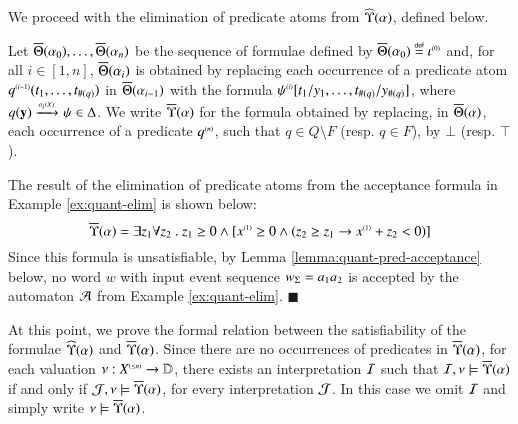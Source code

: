 \documentclass{llncs}
\begin{document}
We proceed with the elimination of predicate atoms from
$\widehat{\Upsilon}({\alpha})$, defined below. 

\begin{definition}\label{def:substform}
  Let $\overline{\Theta}({\alpha_0}), \ldots, \overline{\Theta}({\alpha_n})$ be the
  sequence of formulae defined by $\overline{\Theta}({\alpha_0}) \stackrel{\scriptscriptstyle{\mathsf{def}}}{=}
  {\iota}^{\scriptscriptstyle{({0})}}$ and, for all $i \in [1,n]$,
  $\overline{\Theta}({\alpha_i})$ is obtained by replacing each occurrence of
  a predicate atom ${q}^{\scriptscriptstyle{({i-1})}}(t_1,\ldots,t_{\#(q)})$ in
  $\overline{\Theta}({\alpha_{i-1}})$ with the formula
  ${\psi}^{\scriptscriptstyle{({i})}}[t_1/y_1,\ldots,t_{\#(q)}/y_{\#(q)}]$, where
  $q(\mathbf y) \xrightarrow{{\scriptscriptstyle a_{i}(X)}}_{{\scriptstyle }} \psi \in \Delta$. We write
  $\overline{\Upsilon}({\alpha})$ for the formula obtained by replacing, in
  $\overline{\Theta}({\alpha})$, each occurrence of a predicate
  ${q}^{\scriptscriptstyle{({n})}}$, such that $q \in Q \setminus F$ (resp. $q \in F$),
  by $\bot$ (resp. $\top$).
\end{definition}

\begin{example}\label{ex:pred-elim}
  The result of the elimination of predicate atoms from the acceptance
  formula in Example \ref{ex:quant-elim} is shown below:
  \[\overline{\Upsilon}({\alpha}) = 
  \exists z_1 \forall z_2 ~.~ z_1 \geq 0 \wedge 
          [{x}^{\scriptscriptstyle{({1})}} \geq 0 \wedge (z_2 \geq z_1 \rightarrow
            {x}^{\scriptscriptstyle{({1})}}+z_2 < 0)]\] Since this formula is
          unsatisfiable, by Lemma \ref{lemma:quant-pred-acceptance}
          below, no word $w$ with input event sequence ${w}_\Sigma =
          a_1a_2$ is accepted by the automaton $\mathcal{A}$ from Example
          \ref{ex:quant-elim}. \hfill$\blacksquare$
\end{example}

At this point, we prove the formal relation between the satisfiability
of the formulae $\widehat{\Upsilon}({\alpha})$ and $\overline{\Upsilon}({\alpha})$. Since
there are no occurrences of predicates in $\overline{\Upsilon}({\alpha})$, for
each valuation $\nu : {X}^{\scriptscriptstyle{({\leq n})}} \rightarrow \mathbb{D}$, there
exists an interpretation $\mathcal{I}$ such that $\mathcal{I},\nu \models
\overline{\Upsilon}({\alpha})$ if and only if $\mathcal{J},\nu \models
\overline{\Upsilon}({\alpha})$, for every interpretation $\mathcal{J}$. In this case we
omit $\mathcal{I}$ and simply write $\nu \models \overline{\Upsilon}({\alpha})$.
\end{document}
